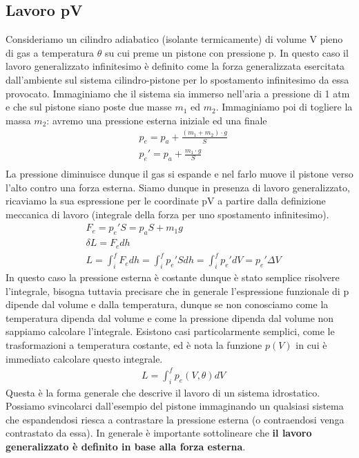 \documentclass[10pt,a4paper]{article}
\begin{document}
\subsection{Lavoro pV}
Consideriamo un cilindro adiabatico (isolante termicamente) di volume V pieno di gas a temperatura $\theta$ su cui preme un pistone con pressione p. In questo caso il lavoro generalizzato infinitesimo è definito come la forza generalizzata esercitata dall'ambiente sul sistema cilindro-pistone per lo spostamento infinitesimo da essa provocato. Immaginiamo che il sistema sia immerso nell'aria a pressione di 1 atm e che sul pistone siano poste due masse $m_1$ ed $m_2$. Immaginiamo poi di togliere la massa $m_2$: avremo una pressione esterna iniziale ed una finale
\begin{align*} 
&p_e=p_a+\frac{(m_1+m_2)\cdot g}{S}\\
&p_e'=p_a+\frac{m_1\cdot g}{S}\\
\end{align*} 
La pressione diminuisce dunque il gas si espande e nel farlo muove il pistone verso l'alto contro una forza esterna. Siamo dunque in presenza di lavoro generalizzato, ricaviamo la sua espressione per le coordinate pV a partire dalla definizione meccanica di lavoro (integrale della forza per uno spostamento infinitesimo). 
\begin{align*} 
	&F_e = p_e' S = p_a S + m_1 g\\
	&\delta L = F_e dh\\
	&L= \int_{i}^{f}F_e dh = \int_{i}^{f} p_e' S dh = \int_{i}^{f} p_e' dV = p_e' \Delta V
\end{align*} 
In questo caso la pressione esterna è costante dunque è stato semplice risolvere l'integrale, bisogna tuttavia precisare che in generale l'espressione funzionale di p dipende dal volume e dalla temperatura, dunque se non conosciamo come la temperatura dipenda dal volume e come la pressione dipenda dal volume non sappiamo calcolare l'integrale. Esistono casi particolarmente semplici, come le trasformazioni a temperatura costante, ed è nota la funzione $p(V)$ in cui è immediato calcolare questo integrale.
\begin{align*} 
	&L= \int_{i}^{f} p_e(V,\theta) dV
\end{align*} 
Questa è la forma generale che descrive il lavoro di un sistema idrostatico. Possiamo svincolarci dall'esempio del pistone immaginando un qualsiasi sistema che espandendosi riesca a contrastare la pressione esterna (o contraendosi venga contrastato da essa). In generale è importante sottolineare che \textbf{il lavoro generalizzato è definito in base alla forza esterna}. \\
\end{document}
